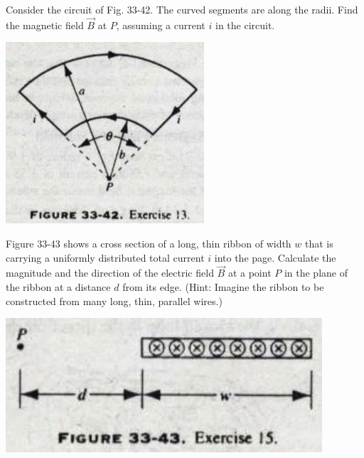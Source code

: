 \documentclass[11pt,letterpaper,boxed]{hmcpset}
\begin{document}
	\begin{problem} [HRK E33.13] Consider the circuit of Fig. 33-42. The curved segments are along the radii. Find the magnetic field $\vec{B}$ at $P$, assuming a current $i$ in the circuit.
	\begin{center}
		\includegraphics[scale=.5]{51m8pic2.jpg}
		\end{center}
	\end{problem}
	\begin{solution}
		\vfill
	\end{solution}
	\newpage

	\begin{problem} [HRK E33.15] Figure 33-43 shows a cross section of a long, thin ribbon of width $w$ that is carrying a uniformly distributed total current $i$ into the page. Calculate the magnitude and the direction of the electric field $\vec{B}$ at a point $P$ in the plane of the ribbon at a distance $d$ from its edge. (Hint: Imagine the ribbon to be constructed from many long, thin, parallel wires.)
			\begin{center}
		\includegraphics[scale=.5]{51m8pic3.jpg}
		\end{center}
	\end{problem}
	
	\begin{solution}
		\vfill
	\end{solution}
	\newpage	
	
\end{document}
